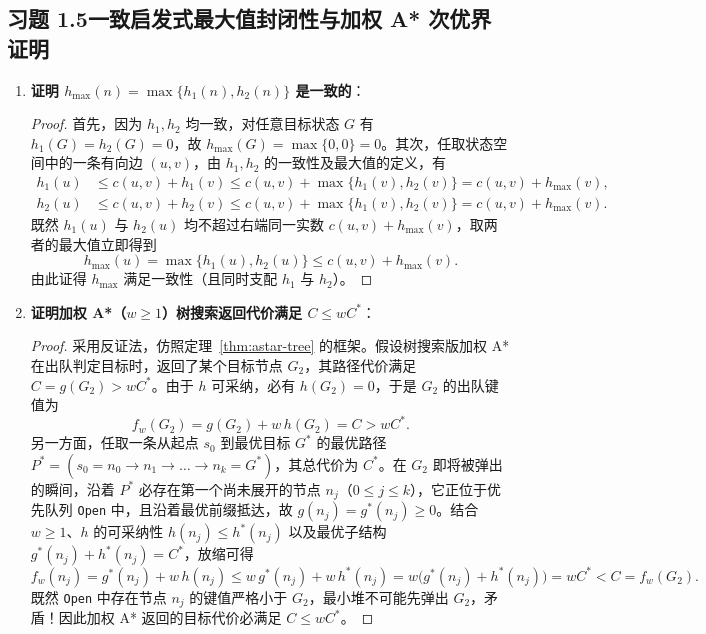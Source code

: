 \subsection*{习题 1.5\quad 一致启发式最大值封闭性与加权 A* 次优界证明}
\begin{enumerate}[label=(\arabic*), leftmargin=1.8em]
  \item \textbf{证明 $h_{\max}(n) = \max\{h_1(n), h_2(n)\}$ 是一致的}：
  \begin{proof}
  首先，因为 $h_1, h_2$ 均一致，对任意目标状态 $G$ 有 $h_1(G) = h_2(G) = 0$，故 $h_{\max}(G) = \max\{0, 0\} = 0$。其次，任取状态空间中的一条有向边 $(u, v)$，由 $h_1, h_2$ 的一致性及最大值的定义，有
  \begin{align*}
    h_1(u) &\le c(u, v) + h_1(v) \le c(u, v) + \max\{h_1(v), h_2(v)\} = c(u, v) + h_{\max}(v), \\
    h_2(u) &\le c(u, v) + h_2(v) \le c(u, v) + \max\{h_1(v), h_2(v)\} = c(u, v) + h_{\max}(v).
  \end{align*}
  既然 $h_1(u)$ 与 $h_2(u)$ 均不超过右端同一实数 $c(u, v) + h_{\max}(v)$，取两者的最大值立即得到
  \[
    h_{\max}(u) = \max\{h_1(u), h_2(u)\} \le c(u, v) + h_{\max}(v).
  \]
  由此证得 $h_{\max}$ 满足一致性（且同时支配 $h_1$ 与 $h_2$）。
  \end{proof}
  \item \textbf{证明加权 A*（$w \ge 1$）树搜索返回代价满足 $C \le w C^*$}：
  \begin{proof}
  采用反证法，仿照定理~\ref{thm:astar-tree} 的框架。假设树搜索版加权 A* 在出队判定目标时，返回了某个目标节点 $G_2$，其路径代价满足 $C = g(G_2) > w C^*$。由于 $h$ 可采纳，必有 $h(G_2) = 0$，于是 $G_2$ 的出队键值为
  \[
    f_w(G_2) = g(G_2) + w\, h(G_2) = C > w C^*.
  \]
  另一方面，任取一条从起点 $s_0$ 到最优目标 $G^*$ 的最优路径 $P^* = (s_0 = n_0 \to n_1 \to \dots \to n_k = G^*)$，其总代价为 $C^*$。在 $G_2$ 即将被弹出的瞬间，沿着 $P^*$ 必存在第一个尚未展开的节点 $n_j$（$0 \le j \le k$），它正位于优先队列 \texttt{Open} 中，且沿着最优前缀抵达，故 $g(n_j) = g^*(n_j) \ge 0$。结合 $w \ge 1$、$h$ 的可采纳性 $h(n_j) \le h^*(n_j)$ 以及最优子结构 $g^*(n_j) + h^*(n_j) = C^*$，放缩可得
  \[
    f_w(n_j) = g^*(n_j) + w\, h(n_j) \le w\, g^*(n_j) + w\, h^*(n_j) = w\big(g^*(n_j) + h^*(n_j)\big) = w C^* < C = f_w(G_2).
  \]
  既然 \texttt{Open} 中存在节点 $n_j$ 的键值严格小于 $G_2$，最小堆不可能先弹出 $G_2$，矛盾！因此加权 A* 返回的目标代价必满足 $C \le w C^*$。
  \end{proof}
\end{enumerate}

